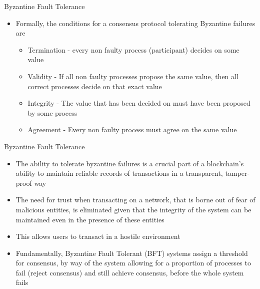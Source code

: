 \documentclass[10pt]{beamer}
\begin{document}
\begin{frame}{Byzantine Fault Tolerance}
	\begin{itemize}
		\item Formally, the conditions for a consensus protocol tolerating Byzantine failures are
		\begin{itemize}
			\item Termination - every non faulty process (participant) decides on some value
			\item Validity - If all non faulty processes propose the same value, then all correct processes decide on that exact value
			\item Integrity - The value that has been decided on must have been proposed by some process
			\item Agreement - Every non faulty process must agree on the same value
		\end{itemize}
	\end{itemize}
\end{frame}


\begin{frame}{Byzantine Fault Tolerance}
	\begin{itemize}
		\item The ability to tolerate byzantine failures is a crucial part of a blockchain's ability to maintain reliable records of transactions in a transparent, tamper-proof way
		\item The need for trust when transacting on a network, that is borne out of fear of malicious entities, is eliminated given that the integrity of the system can be maintained even in the presence of these entities
		\item This allows users to transact in a hostile environment
		\item Fundamentally, Byzantine Fault Tolerant (BFT) systems assign a threshold for consensus, by way of the system allowing for a proportion of processes to fail (reject consensus) and still achieve consensus, before the whole system fails
	\end{itemize}
\end{frame}

\end{document}
